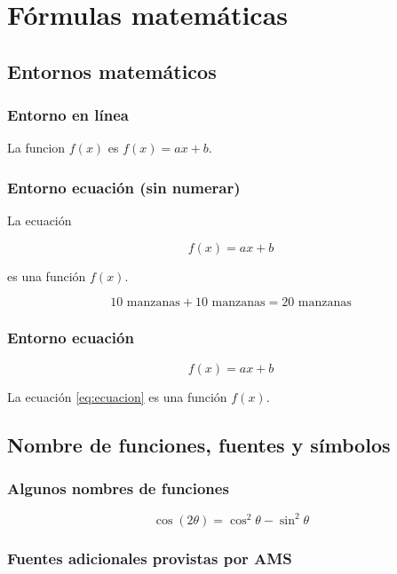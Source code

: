 \documentclass{article}
\begin{document}
\section{Fórmulas matemáticas}

\subsection{Entornos matemáticos}

\subsubsection{Entorno en línea}

La funcion $f(x)$ es $f(x)=ax+b$.

\subsubsection{Entorno ecuación (sin numerar)}
La ecuación

\[
  f(x)=ax+b
\]

es una función $f(x)$.

\[
  10 \text{ manzanas} + 10 \text{ manzanas} = 20 \text{ manzanas}
\]

\subsubsection{Entorno ecuación}

\begin{equation} \label{eq:ecuacion}
  f(x) = ax + b
\end{equation}

La ecuación \eqref{eq:ecuacion} es una función $f(x)$.

\subsection{Nombre de funciones, fuentes y símbolos}

\subsubsection{Algunos nombres de funciones}

\[
  \cos (2\theta) = \cos^2 \theta - \sin^2 \theta
\]


\subsubsection{Fuentes adicionales provistas por AMS}
\end{document}
